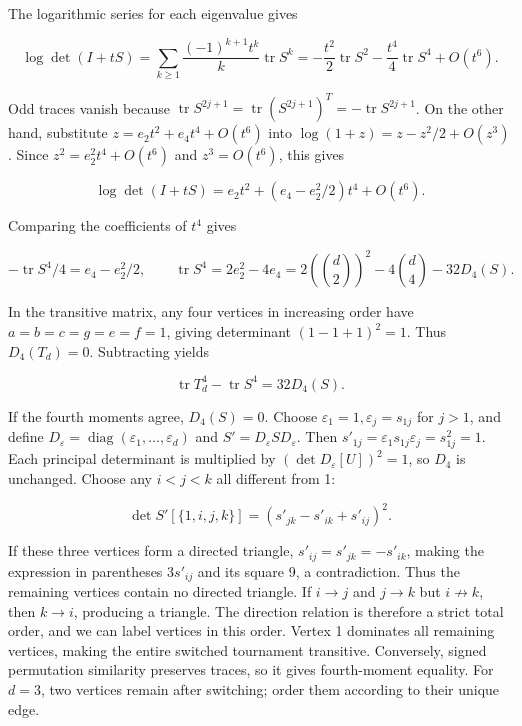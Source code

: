 \documentclass[11pt,a4paper]{article}
\begin{document}
The logarithmic series for each eigenvalue gives

\[
\log\det(I+tS)
=\sum_{k\ge1}\frac{(-1)^{k+1}t^k}{k}\operatorname{tr}S^k
=-\frac{t^2}{2}\operatorname{tr}S^2
-\frac{t^4}{4}\operatorname{tr}S^4+O(t^6).
\]

Odd traces vanish because \(\operatorname{tr}S^{2j+1}=\operatorname{tr}(S^{2j+1})^T=-\operatorname{tr}S^{2j+1}\). On the other hand, substitute \(z=e_2t^2+e_4t^4+O(t^6)\) into \(\log(1+z)=z-z^2/2+O(z^3)\). Since \(z^2=e_2^2t^4+O(t^6)\) and \(z^3=O(t^6)\), this gives

\[
\log\det(I+tS)=e_2t^2+(e_4-e_2^2/2)t^4+O(t^6).
\]

Comparing the coefficients of \(t^4\) gives

\[
-\operatorname{tr}S^4/4=e_4-e_2^2/2,\qquad
\operatorname{tr}S^4=2e_2^2-4e_4
=2\left(\binom d2\right)^2-4\binom d4-32D_4(S).
\]

In the transitive matrix, any four vertices in increasing order have \(a=b=c=g=e=f=1\), giving determinant \((1-1+1)^2=1\). Thus \(D_4(T_d)=0\). Subtracting yields

\[
\operatorname{tr}T_d^4-\operatorname{tr}S^4=32D_4(S).
\]

If the fourth moments agree, \(D_4(S)=0\). Choose \(\varepsilon_1=1,\varepsilon_j=s_{1j}\) for \(j>1\), and define \(D_{\varepsilon}=\operatorname{diag}(\varepsilon_1,\ldots,\varepsilon_d)\) and \(S'=D_{\varepsilon} S D_{\varepsilon}\). Then \(s'_{1j}=\varepsilon_1s_{1j}\varepsilon_j=s_{1j}^2=1\). Each principal determinant is multiplied by \((\det D_{\varepsilon}[U])^2=1\), so \(D_4\) is unchanged. Choose any \(i<j<k\) all different from 1:

\[
\det S'[\{1,i,j,k\}]
=(s'_{jk}-s'_{ik}+s'_{ij})^2.
\]

If these three vertices form a directed triangle, \(s'_{ij}=s'_{jk}=-s'_{ik}\), making the expression in parentheses \(3s'_{ij}\) and its square 9, a contradiction. Thus the remaining vertices contain no directed triangle. If \(i\to j\) and \(j\to k\) but \(i\not\to k\), then \(k\to i\), producing a triangle. The direction relation is therefore a strict total order, and we can label vertices in this order. Vertex 1 dominates all remaining vertices, making the entire switched tournament transitive. Conversely, signed permutation similarity preserves traces, so it gives fourth-moment equality. For \(d=3\), two vertices remain after switching; order them according to their unique edge.

\label{technical-references}
\end{document}
